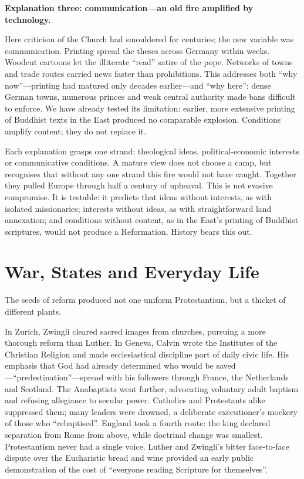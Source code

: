 \textbf{Explanation three: communication---an old fire amplified by technology.}

Here criticism of the Church had smouldered for centuries; the new variable was communication. Printing spread the theses across Germany within weeks. Woodcut cartoons let the illiterate ``read'' satire of the pope. Networks of towns and trade routes carried news faster than prohibitions. This addresses both ``why now''---printing had matured only decades earlier---and ``why here'': dense German towns, numerous princes and weak central authority made bans difficult to enforce. We have already tested its limitation: earlier, more extensive printing of Buddhist texts in the East produced no comparable explosion. Conditions amplify content; they do not replace it.

Each explanation grasps one strand: theological ideas, political-economic interests or communicative conditions. A mature view does not choose a camp, but recognises that without any one strand this fire would not have caught. Together they pulled Europe through half a century of upheaval. This is not evasive compromise. It is testable: it predicts that ideas without interests, as with isolated missionaries; interests without ideas, as with straightforward land annexation; and conditions without content, as in the East's printing of Buddhist scriptures, would not produce a Reformation. History bears this out.

\section{War, States and Everyday Life}
The seeds of reform produced not one uniform Protestantism, but a thicket of different plants.

In Zurich, Zwingli cleared sacred images from churches, pursuing a more thorough reform than Luther. In Geneva, Calvin wrote the Institutes of the Christian Religion and made ecclesiastical discipline part of daily civic life. His emphasis that God had already determined who would be saved---``predestination''---spread with his followers through France, the Netherlands and Scotland. The Anabaptists went further, advocating voluntary adult baptism and refusing allegiance to secular power. Catholics and Protestants alike suppressed them; many leaders were drowned, a deliberate executioner's mockery of those who ``rebaptised''. England took a fourth route: the king declared separation from Rome from above, while doctrinal change was smallest. Protestantism never had a single voice. Luther and Zwingli's bitter face-to-face dispute over the Eucharistic bread and wine provided an early public demonstration of the cost of ``everyone reading Scripture for themselves''.

